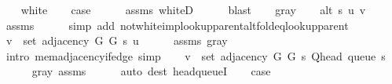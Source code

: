 \begin{isabellebody}
\ \ \isamarkupfalse%
\ white\isanewline
\ \ \isamarkupfalse%
\ {\isacharquery}{\kern0pt}case\isanewline
\ \ \ \ \isamarkupfalse%
\ assms{\isacharparenleft}{\kern0pt}{}{\isacharparenright}{\kern0pt}\ whiteD\isanewline
\ \ \ \ \isamarkupfalse%
\ blast\isanewline
{}\isamarkupfalse%
\isanewline
\ \ \isamarkupfalse%
\ gray\isanewline
\ \ \isamarkupfalse%
\ {\isachardoublequoteopen}alt\ s\ u\ v{\isachardoublequoteclose}\isanewline
\ \ \ \ \isamarkupfalse%
\ assms{\isacharparenleft}{\kern0pt}{}{\isacharparenright}{\kern0pt}\isanewline
\ \ \ \ \isamarkupfalse%
\ {\isacharparenleft}{\kern0pt}simp\ add{\isacharcolon}{\kern0pt}\ not{\isacharunderscore}{\kern0pt}white{\isacharunderscore}{\kern0pt}imp{\isacharunderscore}{\kern0pt}lookup{\isacharunderscore}{\kern0pt}parent{\isacharunderscore}{\kern0pt}alt{\isacharunderscore}{\kern0pt}fold{\isacharunderscore}{\kern0pt}eq{\isacharunderscore}{\kern0pt}lookup{\isacharunderscore}{\kern0pt}parent{\isacharparenright}{\kern0pt}\isanewline
\ \ \isamarkupfalse%
\ {\isachardoublequoteopen}v\ {\isasymin}\ set\ {\isacharparenleft}{\kern0pt}adjacency\ G{}\ G{}\ s\ u{\isacharparenright}{\kern0pt}{\isachardoublequoteclose}\isanewline
\ \ \ \ \isamarkupfalse%
\ assms{\isacharparenleft}{\kern0pt}{}{\isacharparenright}{\kern0pt}\ gray\isanewline
\ \ \ \ \isamarkupfalse%
\ {\isacharparenleft}{\kern0pt}intro\ mem{\isacharunderscore}{\kern0pt}adjacency{\isacharunderscore}{\kern0pt}if{\isacharunderscore}{\kern0pt}edge{\isacharparenright}{\kern0pt}\ simp{\isacharplus}{\kern0pt}\isanewline
\ \ \isamarkupfalse%
\ {\isachardoublequoteopen}v\ {\isasymin}\ set\ {\isacharparenleft}{\kern0pt}adjacency\ G{}\ G{}\ s\ {\isacharparenleft}{\kern0pt}Q{\isacharunderscore}{\kern0pt}head\ {\isacharparenleft}{\kern0pt}queue\ s{\isacharparenright}{\kern0pt}{\isacharparenright}{\kern0pt}{\isacharparenright}{\kern0pt}{\isachardoublequoteclose}\isanewline
\ \ \ \ \isamarkupfalse%
\ gray\ assms{\isacharparenleft}{\kern0pt}{}{\isacharparenright}{\kern0pt}\isanewline
\ \ \ \ \isamarkupfalse%
\ {\isacharparenleft}{\kern0pt}auto\ dest{\isacharcolon}{\kern0pt}\ head{\isacharunderscore}{\kern0pt}queueI{\isacharunderscore}{\kern0pt}{}{\isacharparenright}{\kern0pt}\isanewline
\ \ \isamarkupfalse%
\ {\isacharquery}{\kern0pt}case\isanewline

\end{isabellebody}
